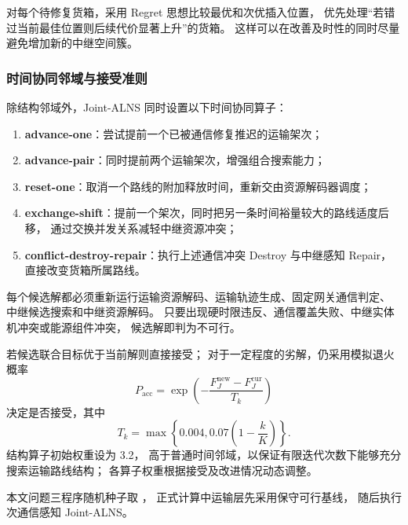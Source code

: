 对每个待修复货箱，采用 Regret 思想比较最优和次优插入位置，
优先处理“若错过当前最佳位置则后续代价显著上升”的货箱。
这样可以在改善及时性的同时尽量避免增加新的中继空间簇。

\subsubsection{时间协同邻域与接受准则}

除结构邻域外，Joint-ALNS 同时设置以下时间协同算子：

\begin{enumerate}[label=(\arabic*),leftmargin=3em]
  \item \textbf{advance-one}：尝试提前一个已被通信修复推迟的运输架次；
  \item \textbf{advance-pair}：同时提前两个运输架次，增强组合搜索能力；
  \item \textbf{reset-one}：取消一个路线的附加释放时间，重新交由资源解码器调度；
  \item \textbf{exchange-shift}：提前一个架次，同时把另一条时间裕量较大的路线适度后移，
        通过交换并发关系减轻中继资源冲突；
  \item \textbf{conflict-destroy-repair}：执行上述通信冲突 Destroy 与中继感知 Repair，直接改变货箱所属路线。
\end{enumerate}

每个候选解都必须重新运行运输资源解码、运输轨迹生成、固定网关通信判定、
中继候选搜索和中继资源解码。
只要出现硬时限违反、通信覆盖失败、中继实体机冲突或能源组件冲突，
候选解即判为不可行。

若候选联合目标优于当前解则直接接受；
对于一定程度的劣解，仍采用模拟退火概率
\begin{equation}
P_{\mathrm{acc}}
=\exp\left(-\frac{F_J^{\mathrm{new}}-F_J^{\mathrm{cur}}}{T_k}\right)
\label{eq:q3-sa}
\end{equation}
决定是否接受，其中
\begin{equation}
T_k
=\max\left\{0.004,
0.07\left(1-\frac{k}{K}\right)
\right\}.
\label{eq:q3-temperature}
\end{equation}
结构算子初始权重设为 3.2，
高于普通时间邻域，以保证有限迭代次数下能够充分搜索运输路线结构；
各算子权重根据接受及改进情况动态调整。

本文问题三程序随机种子取 \QThreeSeed，
正式计算中运输层先采用保守可行基线，
随后执行 \QThreeJointIter 次通信感知 Joint-ALNS。

